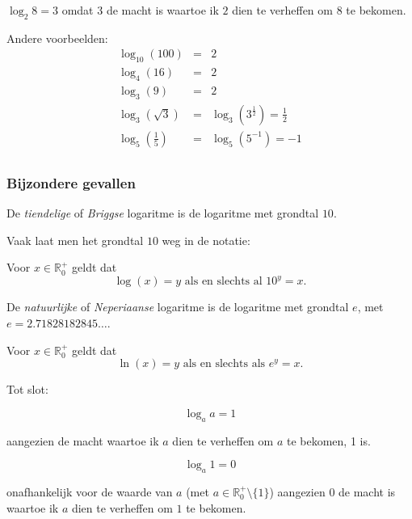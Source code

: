 \begin{voorbeeld}
	$\log_{2}8=3$ omdat $3$ de macht is waartoe ik $2$ dien te verheffen om $8$ te bekomen.
\end{voorbeeld}

\begin{voorbeeld}
	Andere voorbeelden:
	\begin{eqnarray*}
\log_{10}(100)&=&2 \\
\log_{4}(16)&=&2 \\
\log_{3}(9)&=&2 \\
\log_{3}(\sqrt{3})&=&\log_{3}(3^{\frac{1}{2}})=\frac{1}{2} \\
\log_{5}(\frac{1}{5})&=&\log_{5}(5^{-1})=-1 \\
\end{eqnarray*}
\end{voorbeeld}

\subsubsection{Bijzondere gevallen}

De \emph{tiendelige} of \emph{Briggse} logaritme is de logaritme met grondtal $10$.

Vaak laat men het grondtal $10$ weg in de notatie:

\begin{definitie}
	Voor $x \in \mathbb{R}_0^+$ geldt dat
	\begin{equation*}
	\log(x)=y \text{ als en slechts al } 10^y=x.
	\end{equation*}

\end{definitie}

De \emph{natuurlijke} of \emph{Neperiaanse} logaritme is de logaritme met grondtal $e$, met $e=2.71828182845\ldots$.

\begin{definitie}
	Voor $x \in \mathbb{R}_0^+$ geldt dat
	\begin{equation*}
	\ln(x)=y \text{ als en slechts als } e^y=x.
	\end{equation*}
\end{definitie}

Tot slot:

\begin{ftrekenregel}
		\begin{equation*}
	\log_{a}a=1
	\end{equation*}
	
	aangezien de macht waartoe ik $a$ dien te verheffen om $a$ te bekomen, 1 is.	
	
	\begin{equation*}
	\log_{a}1=0
	\end{equation*}
	
	onafhankelijk voor de waarde van $a$ (met $a \in \mathbb{R}_0^+ \setminus \{1\}$) aangezien $0$ de macht is waartoe ik $a$ dien te verheffen om $1$ te bekomen.
\end{ftrekenregel}


